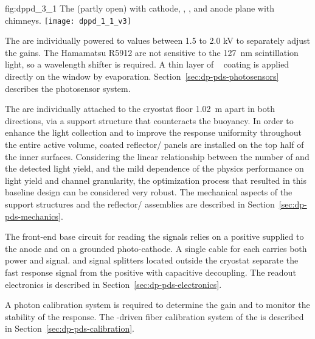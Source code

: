 \begin{dunefigure}{fig:dppd_3_1}
{The  (partly open) with cathode, , , and anode plane with chimneys.}
\texttt{[image: dppd\_1\_1\_v3]}
\end{dunefigure}

The  are individually powered to values between \num{1.5} to \num{2.0} \si{\kV} to separately adjust the  gains. The Hamamatsu R5912  are not sensitive to the \SI{127}{nm} scintillation light, so a wavelength shifter is required. A thin layer of ~\cite{Francini:2013lua} coating is applied directly on the  window by evaporation. Section~\ref{sec:dp-pds-photosensors} describes the photosensor system.

The \dpnumpmtch {} are individually attached to the cryostat floor \SI{1.02}{m} apart in both directions, via a  support structure that counteracts the  buoyancy. In order to enhance the light collection and to improve the  response uniformity throughout the entire  active volume,  coated reflector/ panels are installed on the top half of the  inner surfaces. Considering the linear relationship between the number of  and the detected light yield, and the mild dependence of the  physics performance on light yield and channel granularity, the optimization process that resulted in this baseline design can be considered very robust. The mechanical aspects of the  support structures and the reflector/ assemblies are described in Section~\ref{sec:dp-pds-mechanics}.

The front-end  base circuit for reading the \phel signals relies on a positive  supplied to the  anode and on a grounded photo-cathode. A single cable for each  carries both power and signal.  and signal splitters located outside the cryostat separate the fast  response signal from the positive  with capacitive decoupling. The  readout electronics is described in Section~\ref{sec:dp-pds-electronics}.

A photon calibration system is required to determine the  gain and to monitor the stability of the  response. The -driven fiber calibration system of the  is described in Section~\ref{sec:dp-pds-calibration}. 

